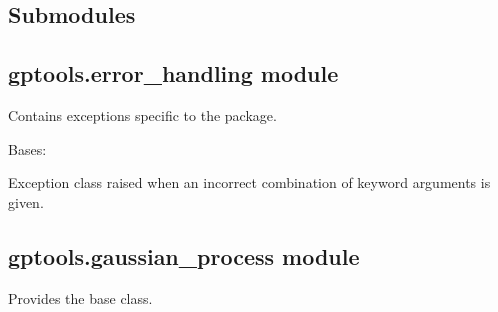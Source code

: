 \documentclass[letterpaper,10pt,english]{sphinxmanual}
\begin{document}
\subsection{Submodules}
\label{gptools:submodules}

\subsection{gptools.error\_handling module}
\label{gptools:gptools-error-handling-module}\label{gptools:module-gptools.error_handling}
Contains exceptions specific to the {\hyperref[gptools:module-gptools]{}} package.

\begin{fulllineitems}
\label{gptools:gptools.error_handling.GPArgumentError}
Bases: 

Exception class raised when an incorrect combination of keyword arguments is given.

\end{fulllineitems}



\subsection{gptools.gaussian\_process module}
\label{gptools:gptools-gaussian-process-module}\label{gptools:module-gptools.gaussian_process}
Provides the base {\hyperref[gptools:gptools.gaussian_process.GaussianProcess]{}} class.
\end{document}
